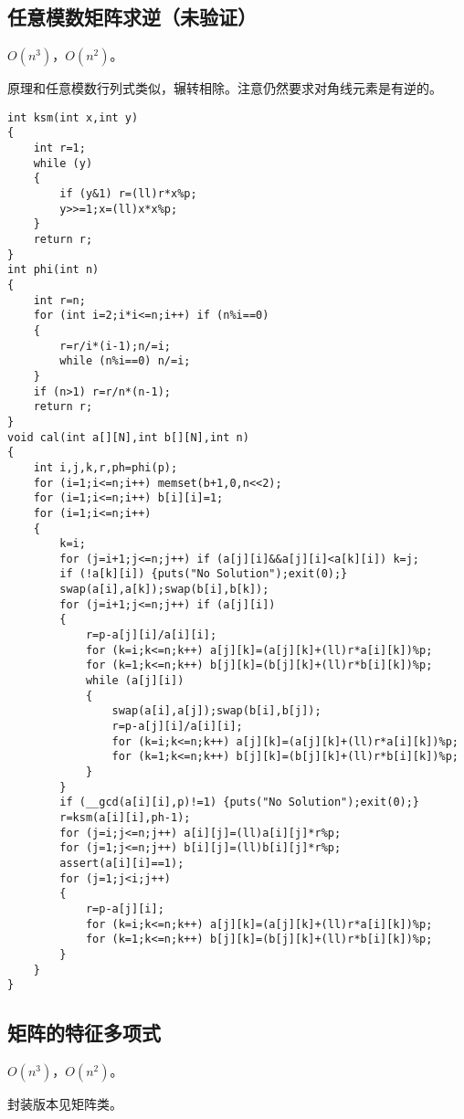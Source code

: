\documentclass[12pt]{ctexart}
\begin{document}
\subsection{任意模数矩阵求逆（未验证）}

$O(n^3)$，$O(n^2)$。

原理和任意模数行列式类似，辗转相除。注意仍然要求对角线元素是有逆的。

\begin{lstlisting}
int ksm(int x,int y)
{
	int r=1;
	while (y)
	{
		if (y&1) r=(ll)r*x%p;
		y>>=1;x=(ll)x*x%p;
	}
	return r;
}
int phi(int n)
{
	int r=n;
	for (int i=2;i*i<=n;i++) if (n%i==0)
	{
		r=r/i*(i-1);n/=i;
		while (n%i==0) n/=i;
	}
	if (n>1) r=r/n*(n-1);
	return r;
}
void cal(int a[][N],int b[][N],int n)
{
	int i,j,k,r,ph=phi(p);
	for (i=1;i<=n;i++) memset(b+1,0,n<<2);
	for (i=1;i<=n;i++) b[i][i]=1;
	for (i=1;i<=n;i++)
	{
		k=i;
		for (j=i+1;j<=n;j++) if (a[j][i]&&a[j][i]<a[k][i]) k=j;
		if (!a[k][i]) {puts("No Solution");exit(0);}
		swap(a[i],a[k]);swap(b[i],b[k]);
		for (j=i+1;j<=n;j++) if (a[j][i])
		{
			r=p-a[j][i]/a[i][i];
			for (k=i;k<=n;k++) a[j][k]=(a[j][k]+(ll)r*a[i][k])%p;
			for (k=1;k<=n;k++) b[j][k]=(b[j][k]+(ll)r*b[i][k])%p;
			while (a[j][i])
			{
				swap(a[i],a[j]);swap(b[i],b[j]);
				r=p-a[j][i]/a[i][i];
				for (k=i;k<=n;k++) a[j][k]=(a[j][k]+(ll)r*a[i][k])%p;
				for (k=1;k<=n;k++) b[j][k]=(b[j][k]+(ll)r*b[i][k])%p;
			}
		}
		if (__gcd(a[i][i],p)!=1) {puts("No Solution");exit(0);}
		r=ksm(a[i][i],ph-1);
		for (j=i;j<=n;j++) a[i][j]=(ll)a[i][j]*r%p;
		for (j=1;j<=n;j++) b[i][j]=(ll)b[i][j]*r%p;
		assert(a[i][i]==1);
		for (j=1;j<i;j++)
		{
			r=p-a[j][i];
			for (k=i;k<=n;k++) a[j][k]=(a[j][k]+(ll)r*a[i][k])%p;
			for (k=1;k<=n;k++) b[j][k]=(b[j][k]+(ll)r*b[i][k])%p;
		}
	}
}
\end{lstlisting}

\subsection{矩阵的特征多项式}


$O(n^3)$，$O(n^2)$。

封装版本见矩阵类。
\end{document}
